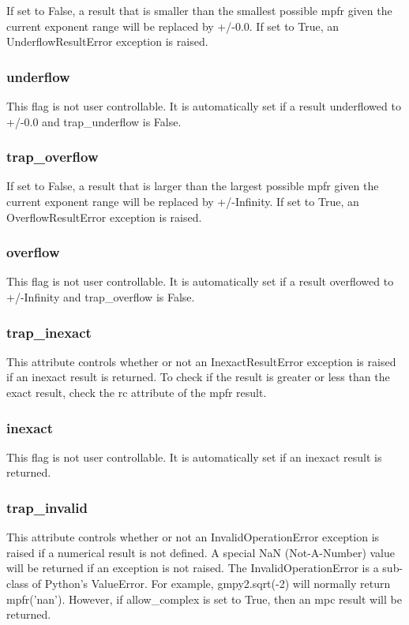 If set to False, a result that is smaller than the smallest possible mpfr given the current
exponent range will be replaced by +/-0.0. If set to True, an UnderflowResultError exception
is raised.

\subsubsection{underflow}

This flag is not user controllable. It is automatically set if a result underflowed to +/-0.0 and
trap\_underflow is False.

\subsubsection{trap\_overflow}

If set to False, a result that is larger than the largest possible mpfr given the current exponent
range will be replaced by +/-Infinity. If set to True, an OverflowResultError exception is
raised.

\subsubsection{overflow}

This flag is not user controllable. It is automatically set if a result overflowed to +/-Infinity and
trap\_overflow is False.

\subsubsection{trap\_inexact}

This attribute controls whether or not an InexactResultError exception is raised if an inexact
result is returned. To check if the result is greater or less than the exact result, check the rc
attribute of the mpfr result.

\subsubsection{inexact}

This flag is not user controllable. It is automatically set if an inexact result is returned.

\subsubsection{trap\_invalid}

This attribute controls whether or not an InvalidOperationError exception is raised if a
numerical result is not defined. A special NaN (Not-A-Number) value will be returned if an
exception is not raised. The InvalidOperationError is a sub-class of Python's ValueError.
For example, gmpy2.sqrt(-2) will normally return mpfr('nan'). However, if allow\_complex is
set to True, then an mpc result will be returned.

